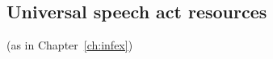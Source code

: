   


    


    
  





\subsection{Universal speech act resources} (as in Chapter~\ref{ch:infex})


  


